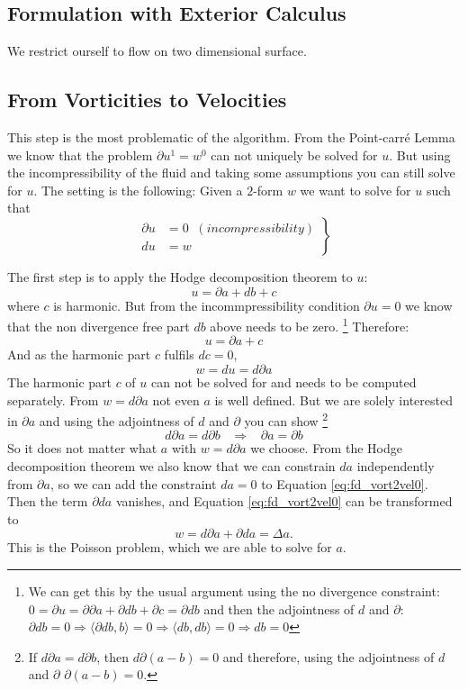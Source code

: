 \subsection{Formulation with Exterior Calculus}
We restrict ourself to flow on two dimensional surface. 

\subsection{From Vorticities to Velocities}
This step is the most problematic of the algorithm. From the Point-carr\'e Lemma we know that the problem $\partial u^1 = w^0$ can not uniquely be solved for $u$. But using the incompressibility of the fluid and taking some assumptions you can still solve for $u$. The setting is the following: Given a $2$-form $w$ we want to solve for $u$ such that
\begin{equation*}\left.\begin{aligned}\partial u &= 0 \;\; (incompressibility) \\ 
du &= w \end{aligned}\right\}\end{equation*}

 The first step is to apply the Hodge decomposition theorem to $u$:
\[u = \partial a + db + c \]
where $c$ is harmonic. But from the incommpressibility condition $\partial u = 0$ we know that the non divergence free part $db$ above needs to be zero.\nobreak
%
\footnote{ We can get this by the usual argument using the no divergence constraint: $0 = \partial u = \partial \partial a + \partial db + \partial c = \partial d b$ and then the adjointness of $d$ and $\partial$: $\partial d b = 0 \Rightarrow \langle \partial d b , b \rangle = 0 \Rightarrow \langle db, db \rangle = 0 \Rightarrow db = 0 $}
%
Therefore: 
\[u = \partial a + c\]
And as the harmonic part $c$ fulfils $dc = 0$,
\begin{equation} w = du = d\partial a \label{eq:fd_vort2vel0}\end{equation}
The harmonic part $c$ of $u$ can not be solved for and needs to be computed separately.  From $w = d \partial a$ not even $a$ is well defined. But we are solely interested in $\partial a$ and using the adjointness of $d$ and $\partial$ you can show \footnote{If $ d \partial a = d \partial b$, then $d \partial (a- b) = 0$ and therefore, using the adjointness of $d$ and $\partial$ $\partial (a-b) = 0.$}
$$d \partial a = d \partial b \;\;\;\Rightarrow\;\;\; \partial a = \partial b$$
So it does not matter what $a$ with $w = d \partial a$ we choose. From the Hodge decomposition theorem we also know that we can constrain $da$ independently from $\partial a$, so we can add the constraint $da = 0$ to Equation \ref{eq:fd_vort2vel0}. Then the term $\partial d a$ vanishes, and Equation \ref{eq:fd_vort2vel0} can be transformed to
\begin{equation} w = d\partial a + \partial d a = \Delta a .\label{eq:fd_vort2vel}\end{equation}
This is the Poisson problem, which we are able to solve for $a$.

